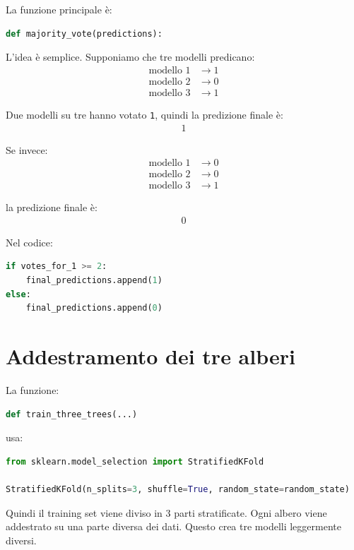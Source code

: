 \documentclass[11pt,a4paper]{article}
\begin{document}
La funzione principale è:
\begin{lstlisting}[language=Python]
def majority_vote(predictions):
\end{lstlisting}

L'idea è semplice. Supponiamo che tre modelli predicano:
\begin{align*}
    \text{modello 1} &\rightarrow 1 \\
    \text{modello 2} &\rightarrow 0 \\
    \text{modello 3} &\rightarrow 1
\end{align*}

Due modelli su tre hanno votato \texttt{1}, quindi la predizione finale è:
\begin{align*}
    1
\end{align*}

Se invece:
\begin{align*}
    \text{modello 1} &\rightarrow 0 \\
    \text{modello 2} &\rightarrow 0 \\
    \text{modello 3} &\rightarrow 1
\end{align*}

la predizione finale è:
\begin{align*}
    0
\end{align*}

Nel codice:
\begin{lstlisting}[language=Python]
if votes_for_1 >= 2:
    final_predictions.append(1)
else:
    final_predictions.append(0)
\end{lstlisting}

\section{Addestramento dei tre alberi}
La funzione:
\begin{lstlisting}[language=Python]
def train_three_trees(...)
\end{lstlisting}

usa:
\begin{lstlisting}[language=Python]
from sklearn.model_selection import StratifiedKFold

StratifiedKFold(n_splits=3, shuffle=True, random_state=random_state)
\end{lstlisting}

Quindi il training set viene diviso in 3 parti stratificate. Ogni albero viene addestrato su una parte diversa dei dati. Questo crea tre modelli leggermente diversi.
\end{document}
